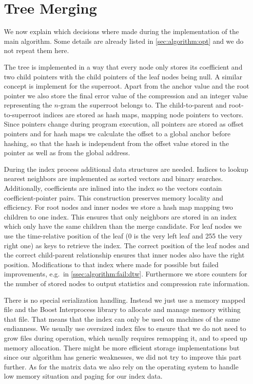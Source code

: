 \section{Tree Merging}
\label{sec:implementation:tree}

We now explain which decisions where made during the implementation of the main algorithm. Some details are already listed in \autoref{sec:algorithm:opt} and we do not repeat them here.

The tree is implemented in a way that every node only stores its coefficient and two child pointers with the child pointers of the leaf nodes being null. A similar concept is implement for the superroot. Apart from the anchor value and the root pointer we also store the final error value of the compression and an integer value representing the $n$-gram the superroot belongs to. The child-to-parent and root-to-superroot indices are stored as hash maps, mapping node pointers to vectors. Since pointers change during program execution, all pointers are stored as offset pointers and for hash maps we calculate the offset to a global anchor before hashing, so that the hash is independent from the offset value stored in the pointer as well as from the global address.

During the index process additional data structures are needed. Indices to lookup nearest neighbors are implemented as sorted vectors and binary searches. Additionally, coefficients are inlined into the index so the vectors contain coefficient-pointer pairs. This construction preserves memory locality and efficiency. For root nodes and inner nodes we store a hash map mapping two children to one index. This ensures that only neighbors are stored in an index which only have the same children than the merge candidate. For leaf nodes we use the time-relative position of the leaf (\num{0} is the very left leaf and \num{255} the very right one) as keys to retrieve the index. The correct position of the leaf nodes and the correct child-parent relationship ensures that inner nodes also have the right position. Modifications to that index where made for possible but failed improvements, e.g.\ in \autoref{ssec:algorithm:fail:dtw}. Furthermore we store counters for the number of stored nodes to output statistics and compression rate information.

There is no special serialization handling. Instead we just use a memory mapped file and the Boost Interprocess library to allocate and manage memory withing that file. That means that the index can only be used on machines of the same endianness. We usually use oversized index files to ensure that we do not need to grow files during operation, which usually requires remapping it, and to speed up memory allocation. There might be more efficient storage implementations but since our algorithm has generic weaknesses, we did not try to improve this part further. As for the matrix data we also rely on the operating system to handle low memory situation and paging for our index data.

